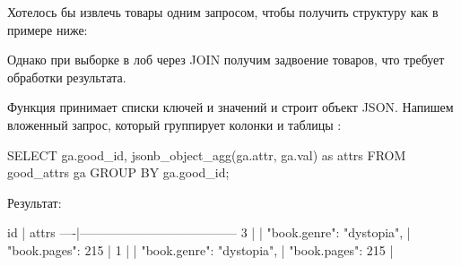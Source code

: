Хотелось бы извлечь товары одним запросом, чтобы получить структуру как в примере ниже:

\begin{english}
  \begin{clojure}
  \end{clojure}
\end{english}

Однако при выборке в лоб через JOIN получим задвоение товаров, что требует обработки результата.

Функция  принимает списки ключей и значений и строит объект JSON. Напишем вложенный запрос, который группирует колонки  и  таблицы :

\begin{english}
  \begin{clojure}
SELECT
  ga.good_id,
  jsonb_object_agg(ga.attr, ga.val) as attrs
FROM
  good_attrs ga
GROUP BY
  ga.good_id;
  \end{clojure}
\end{english}

Результат:


\begin{english}
  \begin{text}
 id |                attrs
----|--------------------------------------
  3 | {
    |   "book.genre": "dystopia",
    |   "book.pages": 215
    | }
  1 | {
    |   "book.genre": "dystopia",
    |   "book.pages": 215
    | }
  \end{text}
\end{english}


